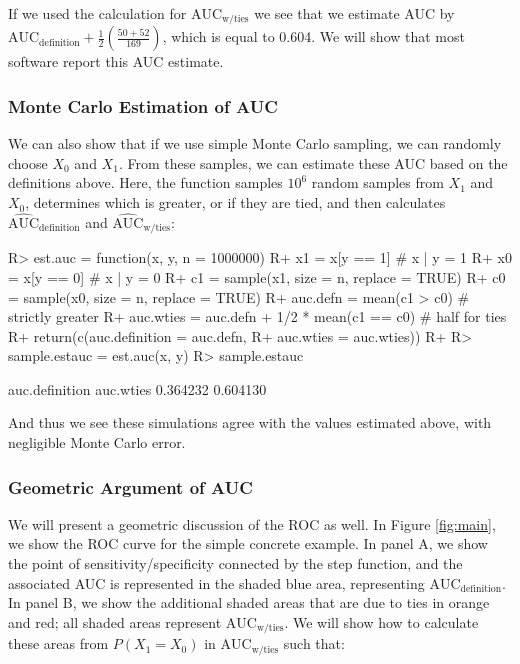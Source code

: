 \documentclass[article]{jss}
\begin{document}
If we used the calculation for \(\text{AUC}_{\text{w/ties}}\) we see
that we estimate AUC by
\(\text{AUC}_{\text{definition}} + \frac{1}{2}\left( \frac{50 + 52}{169}\right)\),
which is equal to 0.604. We will show that most software report this AUC
estimate.

\hypertarget{monte-carlo-estimation-of-auc}{%
\subsubsection{Monte Carlo Estimation of
AUC}\label{monte-carlo-estimation-of-auc}}

We can also show that if we use simple Monte Carlo sampling, we can
randomly choose \(X_{0}\) and \(X_{1}\). From these samples, we can
estimate these AUC based on the definitions above. Here, the function
 samples \(10^{6}\) random samples from \(X_{1}\) and
\(X_{0}\), determines which is greater, or if they are tied, and then
calculates \(\widehat{\text{AUC}}_{\text{definition}}\) and
\(\widehat{\text{AUC}}_{\text{w/ties}}\):

\begin{CodeChunk}

\begin{CodeInput}
R> est.auc = function(x, y, n = 1000000) {
R+   x1 = x[y == 1] # x | y = 1
R+   x0 = x[y == 0] # x | y = 0
R+   c1 = sample(x1, size = n, replace = TRUE)
R+   c0 = sample(x0, size = n, replace = TRUE)
R+   auc.defn = mean(c1 > c0) # strictly greater
R+   auc.wties = auc.defn + 1/2 * mean(c1 == c0) # half for ties
R+   return(c(auc.definition = auc.defn,
R+            auc.wties = auc.wties))
R+ }
R> sample.estauc = est.auc(x, y)
R> sample.estauc
\end{CodeInput}

\begin{CodeOutput}
auc.definition      auc.wties 
      0.364232       0.604130 
\end{CodeOutput}
\end{CodeChunk}

And thus we see these simulations agree with the values estimated above,
with negligible Monte Carlo error.

\hypertarget{geometric-argument-of-auc}{%
\subsubsection{Geometric Argument of
AUC}\label{geometric-argument-of-auc}}

We will present a geometric discussion of the ROC as well. In Figure
\ref{fig:main}, we show the ROC curve for the simple concrete example.
In panel A, we show the point of sensitivity/specificity connected by
the step function, and the associated AUC is represented in the shaded
blue area, representing \(\text{AUC}_{\text{definition}}\). In panel B,
we show the additional shaded areas that are due to ties in orange and
red; all shaded areas represent \(\text{AUC}_{\text{w/ties}}\). We will
show how to calculate these areas from \(P(X_{1} = X_{0})\) in
\(\text{AUC}_{\text{w/ties}}\) such that:
\end{document}
